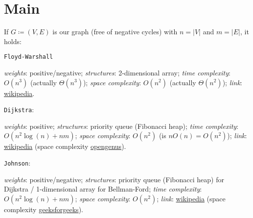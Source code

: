\section{Main}
	If $G \coloneqq (V, E)$ is our graph (free of negative cycles) with $n = |V|$ and $m = |E|$, it holds:
	\begin{itemize}
		\dash \texttt{Floyd-Warshall}
			\begin{itemize}
				\dash \textit{weights}: positive/negative;
				\dash \textit{structures}: 2-dimensional array;
				\dash \textit{time complexity}: $O(n^3)$ (actually $\Theta(n^3)$);
				\dash \textit{space complexity}: $O(n^2)$ (actually $\Theta(n^2)$);
				\dash \textit{link}: \href{https://en.wikipedia.org/wiki/Floyd%E2%80%93Warshall_algorithm#Pseudocode_[11]}{wikipedia}.
			\end{itemize}
		\dash \texttt{Dijkstra}:
			\begin{itemize}
				\dash \textit{weights}: positive;
				\dash \textit{structures}: priority queue (Fibonacci heap);
				\dash \textit{time complexity}: $O(n^2 \log(n) + nm)$;
				\dash \textit{space complexity}: $O(n^2)$ (is $nO(n) = O(n^2)$);
				\dash \textit{link}: \href{https://en.wikipedia.org/wiki/Dijkstra%27s_algorithm#Using_a_priority_queue}{wikipedia} (space complexity \href{https://iq.opengenus.org/time-and-space-complexity-of-dijkstra-algorithm/}{opengenus}).
			\end{itemize}
		\dash \texttt{Johnson}:
			\begin{itemize}
				\dash \textit{weights}: positive/negative;
				\dash \textit{structures}: priority queue (Fibonacci heap) for Dijkstra / 1-dimensional array for Bellman-Ford;
				\dash \textit{time complexity}: $O(n^2 \log(n) + nm)$;
				\dash \textit{space complexity}: $O(n^2)$;
				\dash \textit{link}: \href{https://en.wikipedia.org/wiki/Johnson%27s_algorithm#Algorithm_description}{wikipedia} (space complexity \href{https://www.geeksforgeeks.org/johnsons-algorithm/}{geeksforgeeks}).
			\end{itemize}
	\end{itemize}